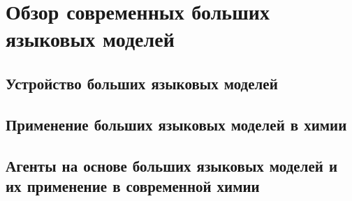 \chapter{Обзор современных больших языковых моделей}\label{ch:ch1}

\section{Устройство больших языковых моделей}\label{sec:ch1/sec1}
\section{Применение больших языковых моделей в химии}\label{sec:ch1/sec2}
\section{Агенты на основе больших языковых моделей и их применение в современной химии}\label{sec:ch1/sec3}


